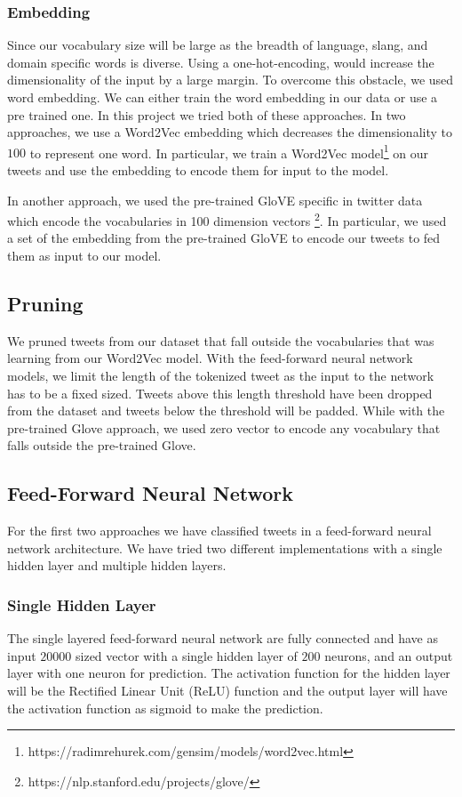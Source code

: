 \subsubsection{Embedding} Since our vocabulary size will be large as
the breadth of language, slang, and domain specific words is diverse.
Using a one-hot-encoding, would increase the dimensionality of the
input by a large margin. To overcome this obstacle, we used word embedding. We can either train the word embedding in our data or use a pre trained one. In this project we tried both of these approaches. In two approaches, we use a Word2Vec embedding \citep{Mikolov:2013:DRW:2999792.2999959} which decreases the dimensionality to $100$ to represent one word. In particular, we train a Word2Vec
model\footnote{https://radimrehurek.com/gensim/models/word2vec.html} on our tweets and use the embedding to encode them for input to the model. 

In another approach, we used the pre-trained GloVE specific in twitter data which encode the vocabularies in 100 dimension vectors \footnote{https://nlp.stanford.edu/projects/glove/}. In particular, we used a set of the embedding from the pre-trained GloVE to encode our tweets to fed them as input to our model. 

\subsection{Pruning} We pruned tweets from our dataset that fall
outside the vocabularies that was learning from our Word2Vec model. With
the feed-forward neural network models, we limit the length of
the tokenized tweet as the input to the network has to be a fixed
sized. Tweets above this length threshold have been dropped from the
dataset and tweets below the threshold will be padded. While with the pre-trained Glove approach, we used zero vector to encode any vocabulary that falls outside the pre-trained Glove. 

\subsection{Feed-Forward Neural Network} For the first two approaches we have classified tweets in a feed-forward neural network
architecture. We have tried two different implementations with a single
hidden layer and multiple hidden layers.

\subsubsection{Single Hidden Layer} The single layered feed-forward
neural network are fully connected and have as input $20000$ sized
vector with a single hidden layer of $200$ neurons, and an output
layer with one neuron for prediction. The activation function for the
hidden layer will be the Rectified Linear Unit (ReLU) function and the
output layer will have the activation function as sigmoid to make the
prediction.

